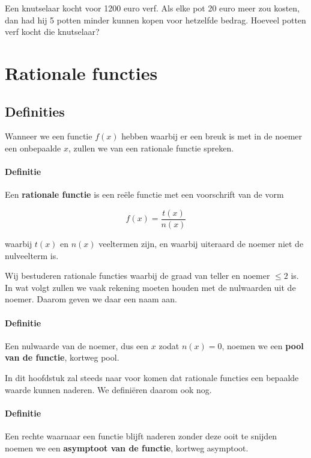 \documentclass[12pt,twoside,a4paper]{article}
\begin{document}
\begin{oefening}
Een knutselaar kocht voor 1200 euro verf. Als elke pot 20 euro meer zou kosten, dan had hij 5 potten minder kunnen kopen voor hetzelfde bedrag. Hoeveel potten verf kocht die knutselaar?
\end{oefening}

\pagebreak
\section{Rationale functies}

\subsection{Definities}

Wanneer we een functie $f(x)$ hebben waarbij er een breuk is met in de noemer een onbepaalde $x$, zullen we van een rationale functie spreken.

\paragraph*{Definitie}
\begin{mdframed}
Een {\bf rationale functie} is een reële functie met een voorschrift van de vorm

$$f(x)=\dfrac{t(x)}{n(x)}$$

waarbij $t(x)$ en $n(x)$ veeltermen zijn, en waarbij uiteraard de noemer niet de nulveelterm is.
\end{mdframed}

Wij bestuderen rationale functies waarbij de graad van teller en noemer $\leq 2$ is. In wat volgt zullen we vaak rekening moeten houden met de nulwaarden uit de noemer. Daarom geven we daar een naam aan.

\paragraph*{Definitie}
\begin{mdframed}
Een nulwaarde van de noemer, dus een $x$ zodat $n(x)=0$, noemen we een {\bf pool van de functie}, kortweg pool.
\end{mdframed}


In dit hoofdstuk zal steeds naar voor komen dat rationale functies een bepaalde waarde kunnen naderen. We definiëren daarom ook nog.

\paragraph*{Definitie}
\begin{mdframed}
Een rechte waarnaar een functie blijft naderen zonder deze ooit te snijden noemen we een {\bf asymptoot van de functie}, kortweg asymptoot.
\end{mdframed}
\end{document}
